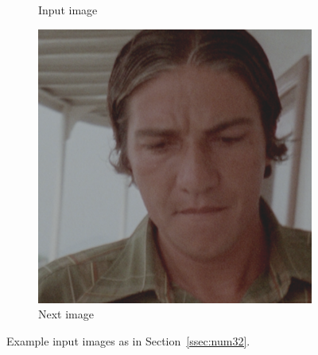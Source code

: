 \begin{figure}[H]
\begin{subfigure}{.3\textwidth}
		\caption[figure]{Input image}
		\label{fig:warp_input}
	\end{subfigure}
	\begin{subfigure}{.3\textwidth}
		\centering
		\includegraphics[width=\linewidth]{warp/next.png}
		\caption[figure]{Next image}
		\label{fig:warp_next}
	\end{subfigure}
	\caption[figure]{Example input images as in Section~\ref{ssec:num32}.}
	\label{fig:warp_1}
\end{figure}

